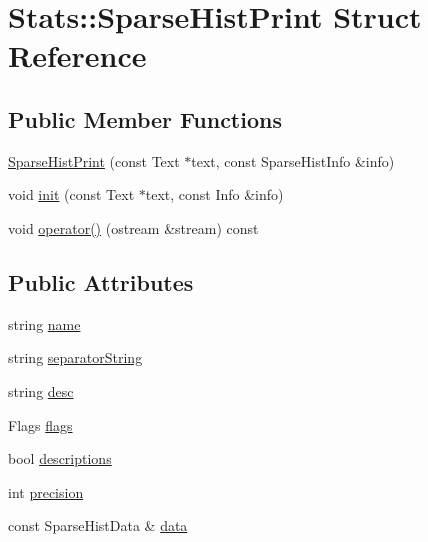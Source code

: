 \hypertarget{structStats_1_1SparseHistPrint}{
\section{Stats::SparseHistPrint Struct Reference}
\label{structStats_1_1SparseHistPrint}
}
\subsection*{Public Member Functions}
\begin{DoxyCompactItemize}
\item 
\hyperlink{structStats_1_1SparseHistPrint_a30fe39f80fc136f7e618b89f8fdc3e35}{SparseHistPrint} (const Text $\ast$text, const SparseHistInfo \&info)
\item 
void \hyperlink{structStats_1_1SparseHistPrint_acba0fb74d0a4c488381ade783de1720d}{init} (const Text $\ast$text, const Info \&info)
\item 
void \hyperlink{structStats_1_1SparseHistPrint_ad86b4f53f3cade0f530d537bd121a6ef}{operator()} (ostream \&stream) const 
\end{DoxyCompactItemize}
\subsection*{Public Attributes}
\begin{DoxyCompactItemize}
\item 
string \hyperlink{structStats_1_1SparseHistPrint_ab767d5886007c432b86a42171f7e1206}{name}
\item 
string \hyperlink{structStats_1_1SparseHistPrint_a72260b9f02d5395232d733329fc6c427}{separatorString}
\item 
string \hyperlink{structStats_1_1SparseHistPrint_a8760dfb52afeeef275a09d0cce044a47}{desc}
\item 
Flags \hyperlink{structStats_1_1SparseHistPrint_a7d6cd92b10d6e566b1cb5602179ae7be}{flags}
\item 
bool \hyperlink{structStats_1_1SparseHistPrint_ab0ff8d6cc914db901ad23dc01738b772}{descriptions}
\item 
int \hyperlink{structStats_1_1SparseHistPrint_a3d11c791cb60284686ed2458773cc52f}{precision}
\item 
const SparseHistData \& \hyperlink{structStats_1_1SparseHistPrint_acc3e076566384cb5a9532b679cfe8a6c}{data}
\end{DoxyCompactItemize}


